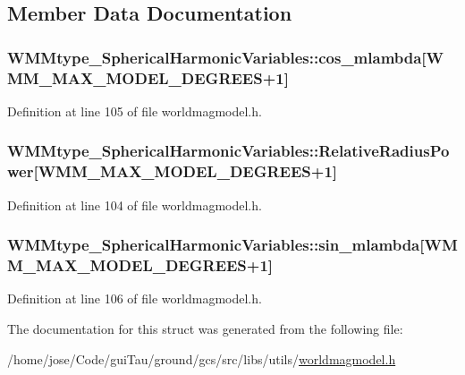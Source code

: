 \subsection{Member Data Documentation}
\hypertarget{struct_w_m_mtype___spherical_harmonic_variables_adf506376126edf63fabf8877e416d52e}{
\subsubsection[{cos\-\_\-mlambda}]{ W\-M\-Mtype\-\_\-\-Spherical\-Harmonic\-Variables\-::cos\-\_\-mlambda\mbox{[}W\-M\-M\-\_\-\-M\-A\-X\-\_\-\-M\-O\-D\-E\-L\-\_\-\-D\-E\-G\-R\-E\-E\-S+1\mbox{]}}}\label{struct_w_m_mtype___spherical_harmonic_variables_adf506376126edf63fabf8877e416d52e}


Definition at line 105 of file worldmagmodel.\-h.

\hypertarget{struct_w_m_mtype___spherical_harmonic_variables_acb306412b3b73ab19d9b2218911de891}{
\subsubsection[{Relative\-Radius\-Power}]{ W\-M\-Mtype\-\_\-\-Spherical\-Harmonic\-Variables\-::\-Relative\-Radius\-Power\mbox{[}W\-M\-M\-\_\-\-M\-A\-X\-\_\-\-M\-O\-D\-E\-L\-\_\-\-D\-E\-G\-R\-E\-E\-S+1\mbox{]}}}\label{struct_w_m_mtype___spherical_harmonic_variables_acb306412b3b73ab19d9b2218911de891}


Definition at line 104 of file worldmagmodel.\-h.

\hypertarget{struct_w_m_mtype___spherical_harmonic_variables_af6906ecd2a98bea39e7d43459d7399cb}{
\subsubsection[{sin\-\_\-mlambda}]{ W\-M\-Mtype\-\_\-\-Spherical\-Harmonic\-Variables\-::sin\-\_\-mlambda\mbox{[}W\-M\-M\-\_\-\-M\-A\-X\-\_\-\-M\-O\-D\-E\-L\-\_\-\-D\-E\-G\-R\-E\-E\-S+1\mbox{]}}}\label{struct_w_m_mtype___spherical_harmonic_variables_af6906ecd2a98bea39e7d43459d7399cb}


Definition at line 106 of file worldmagmodel.\-h.



The documentation for this struct was generated from the following file\-:\begin{DoxyCompactItemize}
\item 
/home/jose/\-Code/gui\-Tau/ground/gcs/src/libs/utils/\hyperlink{worldmagmodel_8h}{worldmagmodel.\-h}\end{DoxyCompactItemize}
